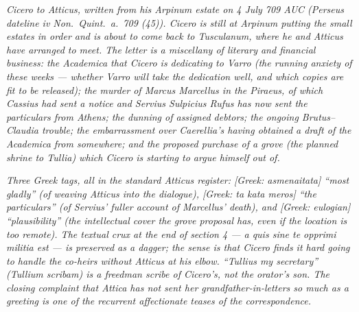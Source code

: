 
\textit{Cicero to Atticus, written from his Arpinum
estate on 4 July 709 AUC (Perseus dateline
\textit{iv Non.\ Quint.\ a.\ 709 (45)}). Cicero is
still at Arpinum putting the small estates in order
and is about to come back to Tusculanum, where he and
Atticus have arranged to meet. The letter is a
miscellany of literary and financial business: the
\textit{Academica} that Cicero is dedicating to Varro
(the running anxiety of these weeks --- whether Varro
will take the dedication well, and which copies are
fit to be released); the murder of Marcus Marcellus
in the Piraeus, of which Cassius had sent a notice
and Servius Sulpicius Rufus has now sent the
particulars from Athens; the dunning of assigned
debtors; the ongoing Brutus--Claudia trouble; the
embarrassment over Caerellia's having obtained a
draft of the \textit{Academica} from somewhere; and
the proposed purchase of a grove (the planned shrine
to Tullia) which Cicero is starting to argue himself
out of.}

\textit{Three Greek tags, all in the standard Atticus
register: \textit{[Greek: asmenaitata]} ``most
gladly'' (of weaving Atticus into the dialogue),
\textit{[Greek: ta kata meros]} ``the particulars'' (of
Servius' fuller account of Marcellus' death), and
\textit{[Greek: eulogian]} ``plausibility'' (the
intellectual cover the grove proposal has, even if
the location is too remote). The textual crux at the
end of section 4 --- \dag{}\textit{a quis sine te
opprimi militia est}\dag{} --- is preserved as a
dagger; the sense is that Cicero finds it hard going
to handle the co-heirs without Atticus at his elbow.
``Tullius my secretary'' (\textit{Tullium scribam}) is
a freedman scribe of Cicero's, not the orator's son.
The closing complaint that Attica has not sent her
grandfather-in-letters so much as a greeting is one
of the recurrent affectionate teases of the
correspondence.}
